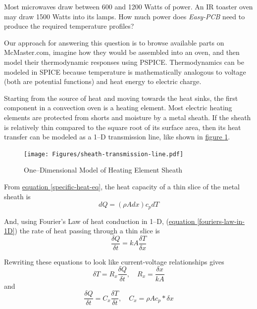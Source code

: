 \documentclass[10pt, twocolumn]{article}
\begin{document}
Most microwaves draw between 600 and 1200 Watts of power.
An IR toaster oven may draw 1500 Watts into its lamps.
How much power does \emph{Easy-PCB} need to produce the required temperature profiles?

Our approach for answering this question is to browse available parts on McMaster.com,
imagine how they would be assembled into an oven,
and then model their thermodynamic responses using PSPICE.
Thermodynamics can be modeled in SPICE because temperature is
mathematically analogous to voltage (both are potential functions)
and heat energy to electric charge.

Starting from the source of heat and moving towards the heat sinks,
the first component in a convection oven is a heating element.
Most electric heating elements are protected from shorts and moisture
by a metal sheath.
If the sheath is relatively thin compared to the square root of its surface area,
then its heat transfer can be modeled as a 1--D transmission line, like shown in
\hyperref[sheath-transmission-line]{figure \ref{sheath-transmission-line}}.

\begin{figure}
\centering
\texttt{[image: Figures/sheath-transmission-line.pdf]}
\caption{One--Dimensional Model of Heating Element Sheath}
\label{sheath-transmission-line}
\end{figure}

From \hyperref[specific-heat-eq]{equation \ref{specific-heat-eq}},
the heat capacity of a thin slice of the metal sheath is
\begin{equation*}
dQ=(\rho A dx)c_{p}dT
\end{equation*}

And, using Fourier's Law of heat conduction in 1--D,
(\hyperref[fouriers-law-in-1D]{equation \ref{fouriers-law-in-1D}})
the rate of heat passing through a thin slice is
\begin{equation*}
\frac{\delta Q}{\delta t}=kA\frac{\delta T}{\delta x}
\end{equation*} 
 
Rewriting these equations to look like current-voltage relationships gives
\begin{equation}
\delta T=R_{x}\frac{\delta Q}{\delta t},
\quad R_{x}=\frac{\delta x}{kA}
\label{differential-resistance-eq}
\end{equation}
and
\begin{equation}
\frac{\delta Q}{\delta t}=C_{x}\frac{\delta T}{\delta t},
\quad C_{x}=\rho A c_{p} * \delta x
\label{differential-capacitance-eq}
\end{equation}
\end{document}
